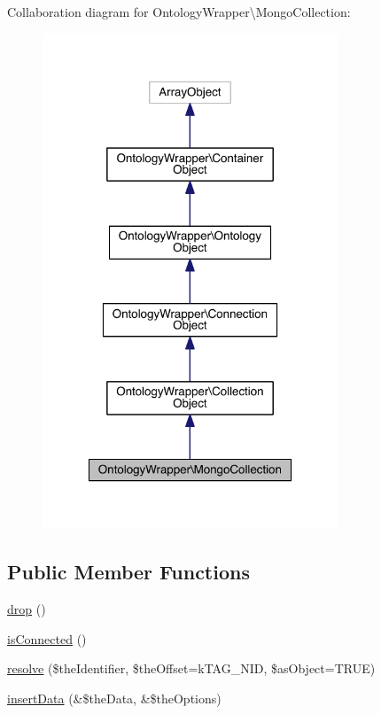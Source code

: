 Collaboration diagram for Ontology\-Wrapper\textbackslash{}Mongo\-Collection\-:
\nopagebreak
\begin{figure}[H]
\begin{center}
\leavevmode
\includegraphics[width=250pt]{class_ontology_wrapper_1_1_mongo_collection__coll__graph}
\end{center}
\end{figure}
\subsection*{Public Member Functions}
\begin{DoxyCompactItemize}
\item 
\hyperlink{class_ontology_wrapper_1_1_mongo_collection_aeee231e29de0e8767d85164a7e833c44}{drop} ()
\item 
\hyperlink{class_ontology_wrapper_1_1_mongo_collection_a560202c9b4f73c72f0ed80729308aa58}{is\-Connected} ()
\item 
\hyperlink{class_ontology_wrapper_1_1_mongo_collection_a60a5da13657f31f20ca01561d21404f4}{resolve} (\$the\-Identifier, \$the\-Offset=k\-T\-A\-G\-\_\-\-N\-I\-D, \$as\-Object=T\-R\-U\-E)
\item 
\hyperlink{class_ontology_wrapper_1_1_mongo_collection_aea1c5282361f10158efbb23319e53d03}{insert\-Data} (\&\$the\-Data, \&\$the\-Options)
\end{DoxyCompactItemize}
